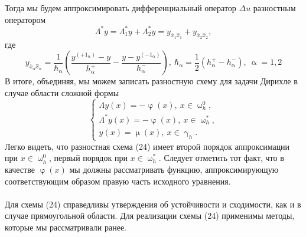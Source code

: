 \documentclass[a4paper, 12pt]{report}
\numberwithin{equation}{section}
\newcommand{\ol}{\overline}
\renewcommand{\alpha}{\upalpha}
\renewcommand{\gamma}{\upgamma}
\renewcommand{\varphi}{\upvarphi}
\renewcommand{\mu}{\upmu}
\renewcommand{\omega}{\upomega}
\begin{document}
	Тогда мы будем аппроксимировать дифференциальный оператор $\Delta u$ разностным оператором
	$$\Lambda ^* y = \Lambda^*_1 y + \Lambda_2^* y = y_{\ol x_1 \hat x_1} + y_{\ol x_2 \hat x_2},$$
	где $$ y_{\ol x_\alpha \hat x_\alpha} = \dfrac{1}{\hbar_\alpha} \left( \dfrac{y^{(+1_\alpha)} - y}{h_\alpha^+} - \dfrac{y- y^{(-1_\alpha)}}{h_\alpha^-}\right),\ \hbar_\alpha = \dfrac{1}{2}(h_\alpha^+ -  h_\alpha^-),\ \alpha=1,2$$
	В итоге, объединяя, мы можем записать разностную схему для задачи Дирихле в случае области сложной формы
	\begin{equation}
		\begin{cases}
		\Lambda y(x) = - \varphi(x),\ x \in \omega_h^0,\\
		\Lambda^* y(x) = -\varphi(x),\ x \in \omega_h^*,\\
		y(x) = \mu(x),\ x \in \gamma_h.
		\end{cases}
	\end{equation}
	Легко видеть, что разностная схема (24) имеет второй порядок аппроксимации при $x \in \omega_h^0$, первый порядок при $x \in \omega_h^*$. Следует отметить тот факт, что в качестве $\varphi(x)$ мы должны рассматривать функцию, аппроксимирующую соответствующим образом правую часть исходного уравнения.\\\\
	Для схемы (24) справедливы утверждения об устойчивости и сходимости, как и в случае прямоугольной области. Для реализации схемы (24) применимы методы, которые мы рассматривали ранее.
\end{document}
